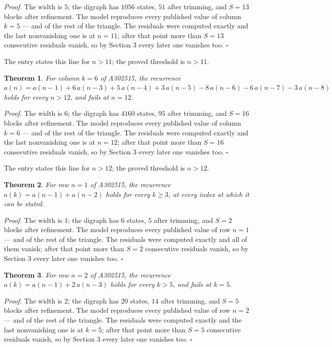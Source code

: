 \documentclass[11pt]{article}
\newtheorem{theorem}{Theorem}
\theoremstyle{definition}
\begin{document}
{\itshape Proof.} The width is $5$; the digraph has $1056$ states, $51$ after trimming, and $S = 13$ blocks after refinement. The model reproduces every published value of column $k = 5$ --- and of the rest of the triangle. The residuals were computed exactly and the last nonvanishing one is at $n = 11$; after that point more than $S = 13$ consecutive residuals vanish, so by Section 3 every later one vanishes too. $\square$

The entry states this line for $n > 11$; the proved threshold is $n > 11$.

\begin{theorem} For column $k = 6$ of A302515, the recurrence $a(n) = a(n-1) + 6\,a(n-3) + 5\,a(n-4) + 3\,a(n-5) - 8\,a(n-6) - 6\,a(n-7) - 3\,a(n-8)$ holds for every $n > 12$, and fails at $n = 12$.\end{theorem}

{\itshape Proof.} The width is $6$; the digraph has $4160$ states, $95$ after trimming, and $S = 16$ blocks after refinement. The model reproduces every published value of column $k = 6$ --- and of the rest of the triangle. The residuals were computed exactly and the last nonvanishing one is at $n = 12$; after that point more than $S = 16$ consecutive residuals vanish, so by Section 3 every later one vanishes too. $\square$

The entry states this line for $n > 12$; the proved threshold is $n > 12$.

\begin{theorem} For row $n = 1$ of A302515, the recurrence $a(k) = a(n-1) + a(n-2)$ holds for every $k \ge 3$, at every index at which it can be stated.\end{theorem}

{\itshape Proof.} The width is $1$; the digraph has $6$ states, $5$ after trimming, and $S = 2$ blocks after refinement. The model reproduces every published value of row $n = 1$ --- and of the rest of the triangle. The residuals were computed exactly and all of them vanish; after that point more than $S = 2$ consecutive residuals vanish, so by Section 3 every later one vanishes too. $\square$

\begin{theorem} For row $n = 2$ of A302515, the recurrence $a(k) = a(n-1) + 2\,a(n-3)$ holds for every $k > 5$, and fails at $k = 5$.\end{theorem}

{\itshape Proof.} The width is $2$; the digraph has $20$ states, $14$ after trimming, and $S = 5$ blocks after refinement. The model reproduces every published value of row $n = 2$ --- and of the rest of the triangle. The residuals were computed exactly and the last nonvanishing one is at $k = 5$; after that point more than $S = 5$ consecutive residuals vanish, so by Section 3 every later one vanishes too. $\square$
\end{document}
